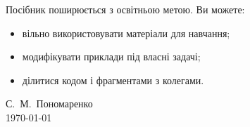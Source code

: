 
Посібник поширюється з освітньою метою. Ви можете:
\begin{itemize}
    \item вільно використовувати матеріали для навчання;
    \item модифікувати приклади під власні задачі;
    \item ділитися кодом і фрагментами з колегами.
\end{itemize}



\vspace{0.5cm}
\begin{flushright}
С.~М.~Пономаренко\\
\today
\end{flushright}
\clearpage
